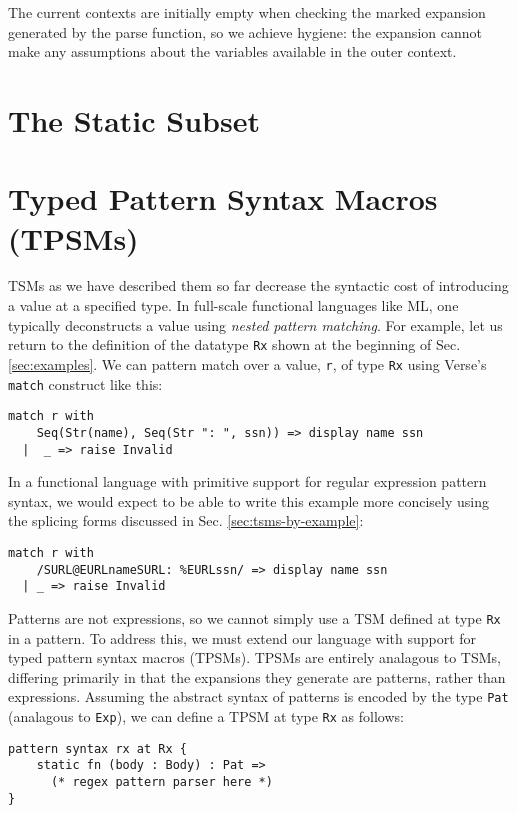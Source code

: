 \begin{enumerate}
The current contexts are initially empty when checking the marked expansion generated by the parse function, so we achieve hygiene: the expansion cannot make any assumptions about the variables available in the outer context. 
\end{enumerate}

\section{The Static Subset}\label{sec:static-subset}
\section{Typed Pattern Syntax Macros (TPSMs)}\label{sec:pattern-tsms}
TSMs as we have described them so far decrease the syntactic cost of introducing a value at a specified type. In full-scale functional languages like ML, one typically deconstructs a value using \emph{nested pattern matching}. For example, let us return to the definition of the datatype \lstinline{Rx} shown at the beginning of Sec. \ref{sec:examples}. We can pattern match over a value, \lstinline{r}, of type \lstinline{Rx} using Verse's \lstinline{match} construct like this:
\begin{lstlisting}[numbers=none]
match r with 
    Seq(Str(name), Seq(Str ": ", ssn)) => display name ssn
  |  _ => raise Invalid
\end{lstlisting}
In a functional language with primitive support for regular expression pattern syntax, we would expect to be able to write this example more concisely using the splicing forms discussed in Sec. \ref{sec:tsms-by-example}:
\begin{lstlisting}[numbers=none]
match r with 
    /SURL@EURLnameSURL: %EURLssn/ => display name ssn
  | _ => raise Invalid
\end{lstlisting}

Patterns are not expressions, so we cannot simply use a TSM defined at type \lstinline{Rx} in a pattern. To address this, we must extend our language with support for typed pattern syntax macros (TPSMs). TPSMs are entirely analagous to TSMs, differing primarily in that the expansions they generate are patterns, rather than expressions. Assuming the abstract syntax of patterns is encoded by the type \lstinline{Pat} (analagous to \lstinline{Exp}), we can define a TPSM at type \lstinline{Rx} as follows:
\begin{lstlisting}[numbers=none]
pattern syntax rx at Rx {
	static fn (body : Body) : Pat => 
	  (* regex pattern parser here *)
}
\end{lstlisting}


